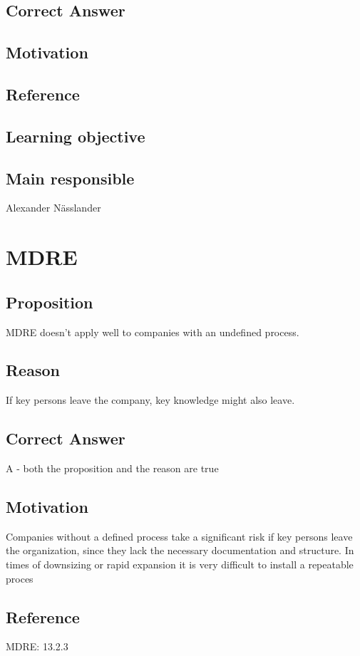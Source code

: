 \documentclass[a4paper]{article}
\begin{document}
\subsection*{Correct Answer}

\subsection*{Motivation}
 
\subsection*{Reference}

\subsection*{Learning objective}

\subsection*{Main responsible}
Alexander Nässlander


\section{MDRE}
\subsection*{Proposition}
MDRE doesn't apply well to companies with an undefined process.
\subsection*{Reason}
If key persons leave the company, key knowledge might also leave.
\subsection*{Correct Answer}
A - both the proposition and the reason are true
\subsection*{Motivation}
Companies without a defined process take a significant risk if key persons leave the organization, since they lack the necessary documentation and structure. In times of downsizing or rapid expansion it is very difficult to install a repeatable proces
\subsection*{Reference}
MDRE: 13.2.3
\end{document}
